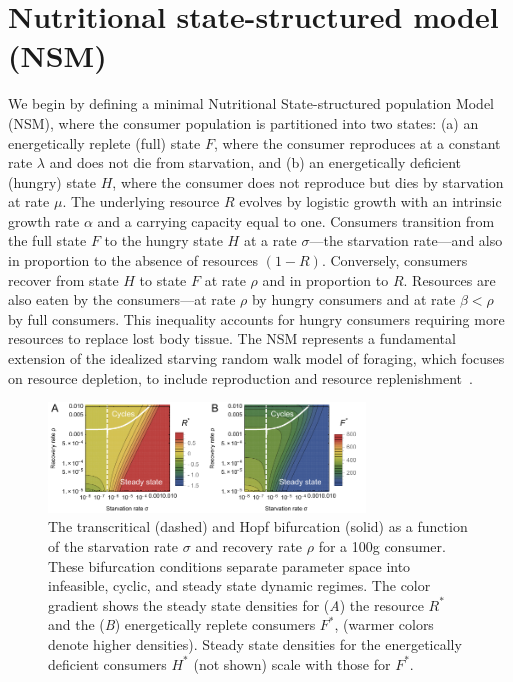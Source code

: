 \documentclass[twocolumn,preprintnumbers,amsmath,amssymb,superscriptaddress]{revtex4}
\begin{document}
\section*{Nutritional state-structured model (NSM)}
We begin by defining a minimal Nutritional State-structured population Model (NSM), where the consumer population is partitioned into two states: (a) an energetically replete (full) state $F$, where the consumer reproduces at a constant rate $\lambda$ and does not die from starvation, and (b) an energetically deficient (hungry) state $H$, where the consumer does not reproduce but dies by starvation at rate $\mu$.  
The underlying resource $R$ evolves by logistic growth with an intrinsic growth rate $\alpha$ and a carrying capacity equal to one.  
Consumers transition from the full state $F$ to the hungry state $H$ at a rate $\sigma$---the starvation rate---and also in proportion to the absence of resources $(1-R)$.  Conversely, consumers recover from state $H$ to state $F$ at rate $\rho$ and in proportion to $R$. 
Resources are also eaten by the consumers---at rate $\rho$ by hungry consumers and at rate $\beta<\rho$ by full consumers.  
This inequality accounts for hungry consumers requiring more resources to replace lost body tissue.  
The NSM represents a fundamental extension of the idealized starving random walk model of foraging, which focuses on resource depletion, to include reproduction and resource replenishment~\cite{Benichou:2014wu,Benichou:2016wl,Chupeau:2016jf}.


\begin{figure}[ht]
\centering
\includegraphics[width=0.75\textwidth]{fig_FixedPoint.pdf}
\caption{\small The transcritical (dashed) and Hopf bifurcation (solid) as a
  function of the starvation rate $\sigma$ and recovery rate $\rho$ for a 100g consumer.  These
  bifurcation conditions separate parameter space into infeasible, cyclic,
  and steady state dynamic regimes.  The color gradient shows the steady
  state densities for (\emph{A}) the resource $R^*$ and the (\emph{B}) energetically
  replete consumers $F^*$, (warmer colors denote higher densities).  Steady
  state densities for the energetically deficient consumers $H^*$ (not shown)
  scale with those for $F^*$.  }
\label{fig:fp}
\end{figure}
\end{document}
